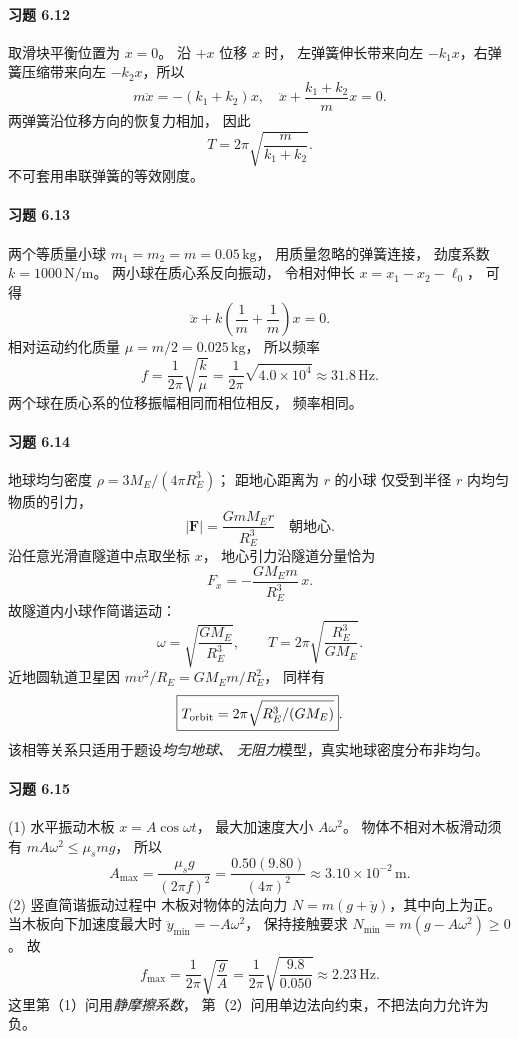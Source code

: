\paragraph{习题 6.12}
取滑块平衡位置为 \(x=0\)。
沿 \(+x\) 位移 \(x\) 时，
左弹簧伸长带来向左
\(-k_1x\)，右弹簧压缩带来向左
\(-k_2x\)，所以
\[
 m\ddot x=-(k_1+k_2)x,
\quad
 \boxed{\ddot x+\frac{k_1+k_2}{m}x=0}.
\]
两弹簧沿位移方向的恢复力相加，
因此
\[
 \boxed{T=2\pi\sqrt{\frac m{k_1+k_2}}}.
\]
不可套用串联弹簧的等效刚度。

\paragraph{习题 6.13}
两个等质量小球
\(m_1=m_2=m=0.05\,\mathrm{kg}\)，
用质量忽略的弹簧连接，
劲度系数
\(k=1000\,\mathrm{N/m}\)。
两小球在质心系反向振动，
令相对伸长 \(x=x_1-x_2-\ell_0\)，
可得
\[
 \ddot x+k\left(\frac1m+\frac1m\right)x=0.
\]
相对运动约化质量
\(\mu=m/2=0.025\,\mathrm{kg}\)，
所以频率
\[
 \boxed{f=\frac1{2\pi}\sqrt{\frac{k}{\mu}}
 =\frac{1}{2\pi}\sqrt{4.0\times10^4}
 \approx31.8\,\mathrm{Hz}}.
\]
两个球在质心系的位移振幅相同而相位相反，
频率相同。

\paragraph{习题 6.14}
地球均匀密度
\(\rho=3M_E/(4\pi R_E^3)\)；
距地心距离为 \(r\) 的小球
仅受到半径 \(r\) 内均匀物质的引力，
\[
 |\boldsymbol F|=\frac{GmM_Er}{R_E^3}
 \quad\text{朝地心}.
\]
沿任意光滑直隧道中点取坐标 \(x\)，
地心引力沿隧道分量恰为
\[
 \boxed{F_x=-\frac{GM_Em}{R_E^3}\,x}.
\]
故隧道内小球作简谐运动：
\[
 \boxed{\omega=\sqrt{\frac{GM_E}{R_E^3}}},
\qquad
 \boxed{T=2\pi\sqrt{\frac{R_E^3}{GM_E}}}.
\]
近地圆轨道卫星因
\(mv^2/R_E=GM_Em/R_E^2\)，
同样有
\[
 \boxed{T_{\rm orbit}=2\pi\sqrt{R_E^3/(GM_E)}}.
\]
该相等关系只适用于题设\emph{均匀地球、
无阻力}模型，真实地球密度分布非均匀。


\paragraph{习题 6.15}
(1) 水平振动木板
\(x=A\cos\omega t\)，
最大加速度大小 \(A\omega^2\)。
物体不相对木板滑动须有
\(mA\omega^2\le\mu_smg\)，
所以
\[
 \boxed{A_{\max}=\frac{\mu_sg}{(2\pi f)^2}
 =\frac{0.50(9.80)}{(4\pi)^2}
 \approx3.10\times10^{-2}\,\mathrm m}.
\]
(2) 竖直简谐振动过程中
木板对物体的法向力
\(N=m(g+\ddot y)\)，其中向上为正。
当木板向下加速度最大时
\(\ddot y_{\min}=-A\omega^2\)，
保持接触要求
\(N_{\min}=m(g-A\omega^2)\ge0\)。
故
\[
 \boxed{f_{\max}=\frac1{2\pi}
 \sqrt{\frac gA}
 =\frac{1}{2\pi}\sqrt{\frac{9.8}{0.050}}
 \approx2.23\,\mathrm{Hz}}.
\]
这里第（1）问用\emph{静摩擦系数}，
第（2）问用单边法向约束，不把法向力允许为负。

